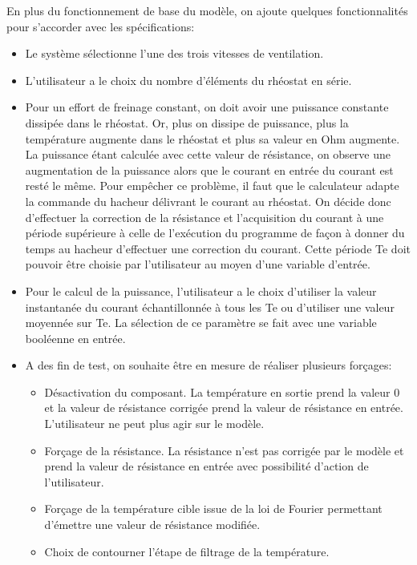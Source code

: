 \documentclass[a4paper]{report}
\begin{document}
	En plus du fonctionnement de base du modèle, on ajoute quelques fonctionnalités pour s'accorder avec les spécifications:
	\begin{itemize}
		\item Le système sélectionne l'une des trois vitesses de ventilation.	
		
		\item L'utilisateur a le choix du nombre d'éléments du rhéostat en série.	
		
		\item Pour un effort de freinage constant, on doit avoir une puissance constante dissipée dans le rhéostat. Or, plus on dissipe de puissance, plus la température augmente dans le rhéostat et plus sa valeur en Ohm augmente. La puissance étant calculée avec cette valeur de résistance, on observe une augmentation de la puissance alors que le courant en entrée du courant est resté le même. Pour empêcher ce problème, il faut que le calculateur adapte la commande du hacheur délivrant le courant au rhéostat. On décide donc d'effectuer la correction de la résistance et l'acquisition du courant à une période supérieure à celle de l'exécution du programme de façon à donner du temps au hacheur d'effectuer une correction du courant. Cette période Te doit pouvoir être choisie par l'utilisateur au moyen d'une variable d'entrée.
		
		\item Pour le calcul de la puissance, l'utilisateur a le choix d'utiliser la valeur instantanée du courant échantillonnée à tous les Te ou d'utiliser une valeur moyennée sur Te. La sélection de ce paramètre se fait avec une variable booléenne en entrée.
		
		\item A des fin de test, on souhaite être en mesure de réaliser plusieurs forçages:
		\begin{itemize}
			\item Désactivation du composant. La température en sortie prend la valeur 0 et la valeur de résistance corrigée prend la valeur de résistance en entrée. L'utilisateur ne peut plus agir sur le modèle.
			\item Forçage de la résistance. La résistance n'est pas corrigée par le modèle et prend la valeur de résistance en entrée avec possibilité d'action de l'utilisateur.
			\item Forçage de la température cible issue de la loi de Fourier permettant d'émettre une valeur de résistance modifiée.
			\item Choix de contourner l'étape de filtrage de la température.
		\end{itemize}
		
	\end{itemize}
	
\end{document}

